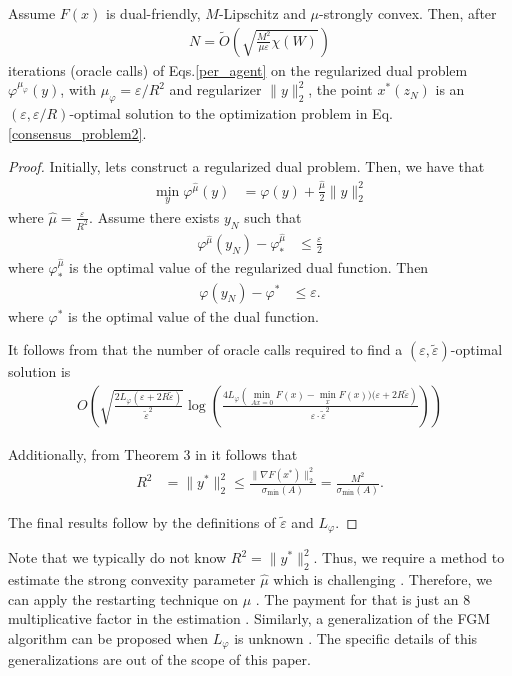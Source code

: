 \documentclass[final]{siamart1116}
\numberwithin{theorem}{section}
\begin{document}
	\begin{theorem}[Case $2$]\label{thm:case2}
		Assume $F(x)$ is dual-friendly, \mbox{$M$-Lipschitz} and $\mu$-strongly convex. Then,
		after
		\begin{align*}
		N = \tilde O\left( \sqrt{\frac{ M^2}{\mu\varepsilon} \chi(W)} \right)
		\end{align*}
		iterations (oracle calls) of Eqs.\cref{per_agent} on the regularized dual problem $\varphi^{\mu_\varphi}(y)$, with $\mu_\varphi = \varepsilon / R^2$ and regularizer $\|y\|_2^2$, the point $x^*(z_N)$ is an $(\varepsilon,\varepsilon/R )$-optimal solution to the optimization problem in Eq. \eqref{consensus_problem2}.
	\end{theorem}
	\begin{proof}
		Initially, lets construct a regularized dual problem. Then, we have that
		\begin{align}\label{dual_regularized}
		\min_y \varphi^{\hat\mu}(y) & = \varphi(y) + \frac{\hat\mu}{2}\|y\|_2^2
		\end{align}
		where $\hat\mu = \frac{\varepsilon}{R^2}$. Assume there exists $y_N$ such that
		\begin{align*}
		\varphi^{\hat\mu}(y_N) - \varphi^{\hat\mu}_* &\leq \frac{\varepsilon}{2}
		\end{align*}
		where $\varphi^{\hat\mu}_*$ is the optimal value of the regularized dual function. Then
		\begin{align*}
		\varphi(y_N) - \varphi^* &\leq \varepsilon.
		\end{align*}
		where $\varphi^*$ is the optimal value of the dual function.
		
		It follows from \cite{gas16b} that the number of oracle calls required to find a $(\varepsilon,\tilde{\varepsilon})$-optimal solution is
		\begin{align*}
		O\left(  \sqrt{\frac{2L_\varphi(\varepsilon + 2R \tilde{\varepsilon})}{\tilde{\varepsilon}^2}}\log\left(\frac{4L_\varphi \left(  \min\limits_{Ax=0}F(x)-\min\limits_x F(x))(\varepsilon+2R\tilde{\varepsilon}\right) }{\varepsilon\cdot \tilde{\varepsilon}^2}\right)\right)
		\end{align*}
		
		Additionally, from Theorem $3$ in \cite{lan17} it follows that
		\begin{align}\label{Soomin_bound}
		R^2 & = \|y^*\|_2^2 \leq \frac{\|\nabla F(x^*)\|_2^2}{\sigma_{\min}(A)} = \frac{M^2}{\sigma_{\min}(A)}.
		\end{align}
		
		The final results follow by the definitions of $\tilde\varepsilon$ and $L_\varphi$. 
		
	\end{proof}
	Note that we typically do not know $R^2 = \|y^*\|_2^2$. Thus, we require a method to estimate the strong convexity parameter $\hat{\mu}$ which is challenging \cite{nes07,odo15}. Therefore, we can apply the restarting technique on $\mu$ \cite{odo15}. The payment for that is just an $8$ multiplicative factor in the estimation \cite{iou14}. Similarly, a generalization of the FGM algorithm can be proposed when $L_\varphi$ is unknown \cite{ani17}. The specific details of this generalizations are out of the scope of this paper.
	
\end{document}
